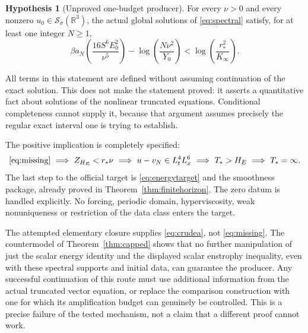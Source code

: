 \documentclass[11pt,a4paper]{article}
\theoremstyle{definition}\newtheorem{definition}[theorem]{Definition}
\newtheorem{hypothesis}[theorem]{Hypothesis}
\theoremstyle{remark}\newtheorem{remark}[theorem]{Remark}
\newcommand{\R}{\mathbb R}
\newcommand{\Sch}{\mathcal S_\sigma(\R^3)}
\newcommand{\rstar}{r_*}
\newcommand{\Kinf}{K_\infty}
\numberwithin{equation}{section}
\begin{document}
\begin{hypothesis}[Unproved one-budget producer]\label{hyp:producer}
For every $\nu>0$ and every nonzero $u_0\in\Sch$, the actual global solutions of \eqref{eq:spectral} satisfy, for at least one integer $N\ge1$,
\begin{equation}\label{eq:missing}
 \boxed{\quad
 \beta a_N\!\left(\frac{16S^6E_0^2}{\nu^5}\right)
 -\log\!\left(\frac{N\nu^2}{Y_0}\right)
 <\log\!\left(\frac{\rstar^2}{\Kinf}\right).
 \quad}
\end{equation}
\end{hypothesis}
All terms in this statement are defined without assuming continuation of the exact solution. This does not make the statement proved: it asserts a quantitative fact about solutions of the nonlinear truncated equations. Conditional completeness cannot supply it, because that argument assumes precisely the regular exact interval one is trying to establish.

The positive implication is completely specified:
\[
 \eqref{eq:missing}\ \Longrightarrow\ Z_{H_E}<\rstar\nu
 \ \Longrightarrow\ u-v_N\in L^4_tL^6_x
 \ \Longrightarrow\ T_*>H_E
 \ \Longrightarrow\ T_*=\infty.
\]
The last step to the official target is \eqref{eq:energytarget} and the smoothness package, already proved in Theorem~\ref{thm:finitehorizon}. The zero datum is handled explicitly. No forcing, periodic domain, hyperviscosity, weak nonuniqueness or restriction of the data class enters the target.

The attempted elementary closure supplies \eqref{eq:crudea}, not \eqref{eq:missing}. The countermodel of Theorem~\ref{thm:capped} shows that no further manipulation of just the scalar energy identity and the displayed scalar enstrophy inequality, even with these spectral supports and initial data, can guarantee the producer. Any successful continuation of this route must use additional information from the actual truncated vector equation, or replace the comparison construction with one for which its amplification budget can genuinely be controlled. This is a precise failure of the tested mechanism, not a claim that a different proof cannot work.
\end{document}
